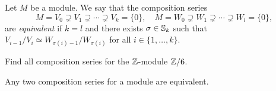 \begin{definition}
    Let $M$ be a module. 
	We say that the composition series
	\[
	M=V_0\supsetneq V_1\supsetneq\cdots\supsetneq V_k=\{0\},
	\quad
	M=W_0\supsetneq W_1\supsetneq\cdots\supsetneq W_l=\{0\},
	\]
	are \emph{equivalent} if $k=l$ and there exists 
	$\sigma\in\mathbb{S}_k$ such that 
	$V_{i-1}/V_{i}\simeq W_{\sigma(i)-1}/W_{\sigma(i)}$
	for all $i\in\{1,\dots,k\}$.
\end{definition}

\begin{exercise}
\label{xca:Z6}
    Find all composition series
    for the $\mathbb{Z}$-module $\mathbb{Z}/6$. 
\end{exercise}

\begin{theorem}
	\label{thm:JordanHolder}
	Any two composition series for a module are equivalent. 
\end{theorem}

